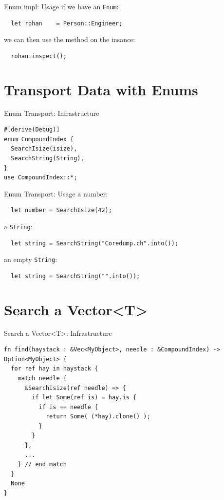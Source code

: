 \documentclass[aspectratio=1610,t]{beamer}
\begin{document}
\begin{frame}[fragile]{Enum impl: Usage}
if we have an \texttt{Enum}:
  \begin{verbatim}
  let rohan    = Person::Engineer;
  \end{verbatim}

we can then use the method on the insance:
  \begin{verbatim}
  rohan.inspect();
  \end{verbatim}
\end{frame}




{
\section{Transport Data with Enums}
}

\begin{frame}[fragile]{Enum Transport: Infrastructure}
\begin{verbatim}
#[derive(Debug)]
enum CompoundIndex {
  SearchIsize(isize),
  SearchString(String),
}
use CompoundIndex::*;
\end{verbatim}
\end{frame}


\begin{frame}[fragile]{Enum Transport: Usage}
a number:
  \begin{verbatim}
  let number = SearchIsize(42);
  \end{verbatim}

\pause
a \texttt{String}:
  \begin{verbatim}
  let string = SearchString("Coredump.ch".into());
  \end{verbatim}

\pause
an empty \texttt{String}:
  \begin{verbatim}
  let string = SearchString("".into());
  \end{verbatim}
\end{frame}


{
\section{Search a Vector<T>}
}

\begin{frame}[fragile]{Search a Vector<T>: Infrastructure}
\begin{verbatim}
fn find(haystack : &Vec<MyObject>, needle : &CompoundIndex) -> Option<MyObject> {
  for ref hay in haystack {
    match needle {
      &SearchIsize(ref needle) => {
        if let Some(ref is) = hay.is {
          if is == needle {
            return Some( (*hay).clone() );
          }
        }
      },
      ...
    } // end match
  }
  None
}
\end{verbatim}
\end{frame}
\end{document}
